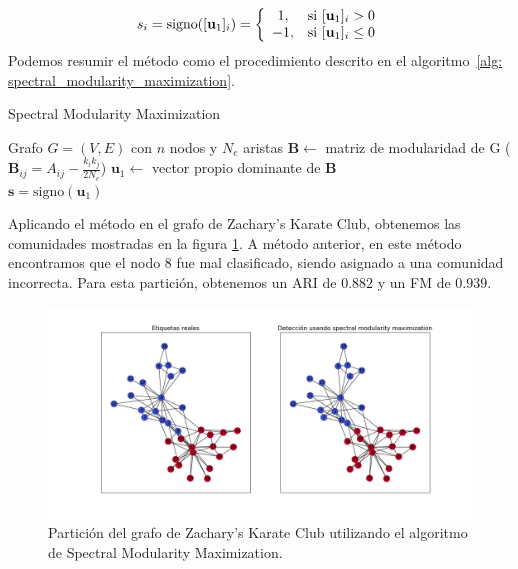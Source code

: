 \documentclass{article}
\begin{document}
\begin{equation*}
    s_i = \text{signo}([\mathbf{u}_1]_i) = \left\lbrace 
    \begin{array}{c l}
         1, & \text{si } [\mathbf{u}_1]_i > 0 \\
        -1, & \text{si } [\mathbf{u}_1]_i \leq 0
    \end{array}\right.
\end{equation*}
Podemos resumir el método como el procedimiento descrito en el algoritmo~\ref{alg: spectral_modularity_maximization}.
\begin{algorithm}
    \caption{Spectral Modularity Maximization}
    \label{alg: spectral_modularity_maximization}
    \begin{algorithmic}
    \Require Grafo $G = (V, E)$ con $n$ nodos y $N_e$ aristas
    \State $\mathbf{B} \leftarrow $ matriz de modularidad de G ($\mathbf{B}_{ij} = A_{ij} - \frac{k_i k_j}{2N_e}$)
    \State $\mathbf{u}_1 \leftarrow $ vector propio dominante de $\mathbf{B}$ \\ 
    \Return $\mathbf{s} = \text{signo}(\mathbf{u}_1)$
    \end{algorithmic}
\end{algorithm}


Aplicando el método en el grafo de Zachary's Karate Club, obtenemos las comunidades mostradas en la figura \ref{fig: spectral_modularity_maximization}. A método anterior, en este método encontramos que el nodo 8 fue mal clasificado, siendo asignado a una comunidad incorrecta. Para esta partición, obtenemos un ARI de $0.882$ y un FM de $0.939$.

\begin{figure}[htb]
    \centering
    \includegraphics[width=\textwidth]{imagenes/spectral_modularity_maximization.png}
    \caption{Partición del grafo de Zachary's Karate Club utilizando el algoritmo de Spectral Modularity Maximization.}

    \label{fig: spectral_modularity_maximization}
\end{figure}
\end{document}
